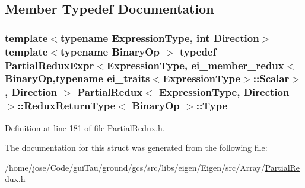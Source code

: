\subsection{Member Typedef Documentation}
\hypertarget{struct_partial_redux_1_1_redux_return_type_ab9976d442c8a54655b6c16ecc8ad8aa5}{
\subsubsection[{Type}]{\setlength{\rightskip}{0pt plus 5cm}template$<$typename Expression\-Type, int Direction$>$ template$<$typename Binary\-Op $>$ typedef {\bf Partial\-Redux\-Expr}$<$Expression\-Type, {\bf ei\-\_\-member\-\_\-redux}$<$Binary\-Op,typename {\bf ei\-\_\-traits}$<$Expression\-Type$>$\-::{\bf Scalar}$>$, Direction $>$ {\bf Partial\-Redux}$<$ Expression\-Type, Direction $>$\-::{\bf Redux\-Return\-Type}$<$ Binary\-Op $>$\-::{\bf Type}}}\label{struct_partial_redux_1_1_redux_return_type_ab9976d442c8a54655b6c16ecc8ad8aa5}


Definition at line 181 of file Partial\-Redux.\-h.



The documentation for this struct was generated from the following file\-:\begin{DoxyCompactItemize}
\item 
/home/jose/\-Code/gui\-Tau/ground/gcs/src/libs/eigen/\-Eigen/src/\-Array/\hyperlink{_partial_redux_8h}{Partial\-Redux.\-h}\end{DoxyCompactItemize}
